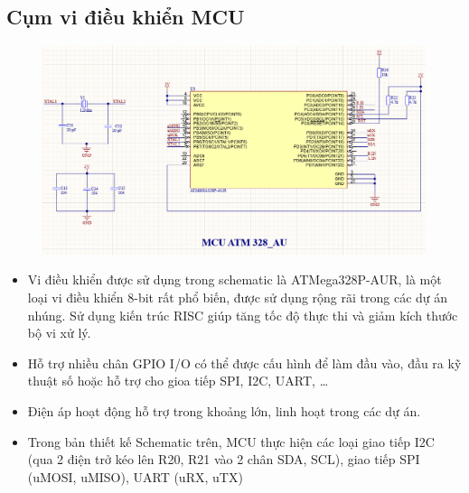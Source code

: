 \subsection{Cụm vi điều khiển MCU}
\begin{figure}[H]
    \centering
    \includegraphics[width=1\textwidth]{pictures/mcu.png}
\end{figure}
\begin{itemize}
    \item Vi điều khiển được sử dụng trong schematic là ATMega328P-AUR, là một loại vi điều khiển 8-bit rất phổ biến, được sử dụng rộng rãi trong các dự án nhúng.
    Sử dụng kiến trúc RISC giúp tăng tốc độ thực thi và giảm kích thước bộ vi xử lý.
    \item Hỗ trợ nhiều chân GPIO I/O có thể được cấu hình để làm đầu vào, đầu ra kỹ thuật số hoặc hỗ trợ cho gioa tiếp SPI, I2C, UART, \dots
    \item Điện áp hoạt động hỗ trợ trong khoảng lớn, linh hoạt trong các dự án.
    \item Trong bản thiết kế Schematic trên, MCU thực hiện các loại giao tiếp I2C (qua 2 điện trở kéo lên R20, R21 vào 2 chân SDA, SCL), giao tiếp SPI (uMOSI, uMISO), UART (uRX, uTX)
\end{itemize}


